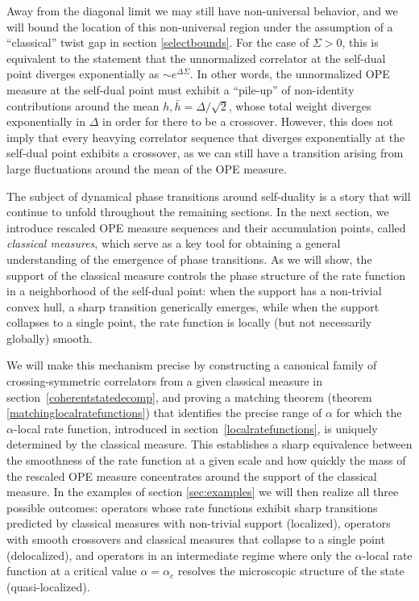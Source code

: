 \documentclass[a4paper,11pt]{article}
\theoremstyle{plain}
\theoremstyle{definition}
\theoremstyle{remark}
\newcommand{\De}{\Delta}
\begin{document}
Away from the diagonal limit we may still have non-universal behavior, and we will bound the location of this non-universal region under the assumption of a ``classical'' twist gap in section \ref{selectbounds}. For the case of $\Sigma > 0$, this is equivalent to the statement that the unnormalized correlator at the self-dual point diverges exponentially as $\sim e^{\De \Sigma}$. In other words, the unnormalized OPE measure at the self-dual point must exhibit a ``pile-up'' of non-identity contributions around the mean $h,\bar{h} = \De/\sqrt{2}$, whose total weight diverges exponentially in $\De$ in order for there to be a crossover. However, this does not imply that every heavying correlator sequence that diverges exponentially at the self-dual point exhibits a crossover, as we can still have a transition arising from large fluctuations around the mean of the OPE measure.
 
The subject of dynamical phase transitions around self-duality is a story that will continue to unfold throughout the remaining sections. In the next section, we introduce rescaled OPE measure sequences and their accumulation points, called {\it classical measures}, which serve as a key tool for obtaining a general understanding of the emergence of phase transitions. As we will show, the support of the classical measure controls the phase structure of the rate function in a neighborhood of the self-dual point: when the support has a non-trivial convex hull, a sharp transition generically emerges, while when the support collapses to a single point, the rate function is locally (but not necessarily globally) smooth. 

We will make this mechanism precise by constructing a canonical family of crossing-symmetric correlators from a given classical measure in section~\ref{coherentstatedecomp}, and proving a matching theorem (theorem \ref{matchinglocalratefunctions}) that identifies the precise range of $\alpha$ for which the $\alpha$-local rate function, introduced in section~\ref{localratefunctions}, is uniquely determined by the classical measure. This establishes a sharp equivalence between the smoothness of the rate function at a given scale and how quickly the mass of the rescaled OPE measure concentrates around the support of the classical measure. In the examples of section \ref{sec:examples} we will then realize all three possible outcomes: operators whose rate functions exhibit sharp transitions predicted by classical measures with non-trivial support (localized), operators with smooth crossovers and classical measures that collapse to a single point (delocalized), and operators in an intermediate regime where only the $\alpha$-local rate function at a critical value $\alpha = \alpha_c$ resolves the microscopic structure of the state (quasi-localized). 
\end{document}

